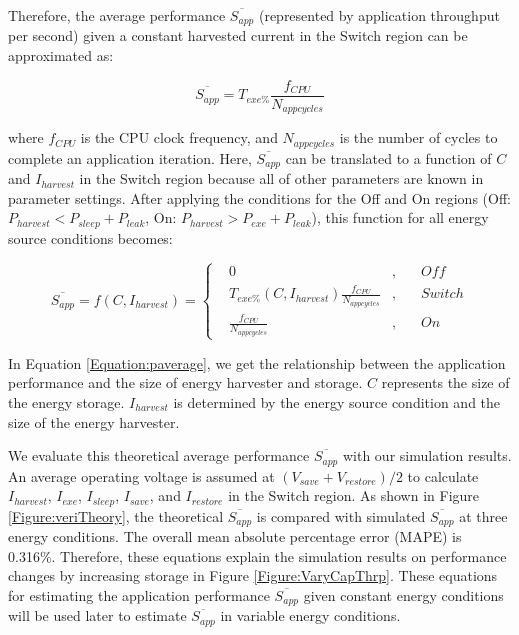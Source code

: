 Therefore, the average performance $\overline{S_{app}}$ (represented by application throughput per second) given a constant harvested current in the Switch region can be approximated as:

\begin{equation}
    \overline{S_{app}} = T_{exe\%}\frac{f_{CPU}}{N_{appcycles}}
\end{equation}

where $f_{CPU}$ is the CPU clock frequency, and $N_{appcycles}$ is the number of cycles to complete an application iteration. Here, $\overline{S_{app}}$ can be translated to a function of $C$ and $I_{harvest}$ in the Switch region because all of other parameters are known in parameter settings. After applying the conditions for the Off and On regions (Off: $P_{harvest} < P_{sleep} + P_{leak}$, On: $P_{harvest} > P_{exe} + P_{leak}$), this function for all energy source conditions becomes:

\begin{equation}
    \overline{S_{app}} = f(C, I_{harvest}) = \left\{\begin{aligned}
        & 0 & , & \quad Off \\
        & T_{exe\%} (C, I_{harvest}) \frac{f_{CPU}}{N_{appcycles}} & , & \quad Switch \\
        & \frac{f_{CPU}}{N_{appcycles}} & , & \quad On
    \end{aligned}
    \right.
    \label{Equation:paverage}
\end{equation}

In Equation \ref{Equation:paverage}, we get the relationship between the application performance and the size of energy harvester and storage. $C$ represents the size of the energy storage. $I_{harvest}$ is determined by the energy source condition and the size of the energy harvester. 

We evaluate this theoretical average performance $\overline{S_{app}}$ with our simulation results. An average operating voltage is assumed at $(V_{save} + V_{restore})/2$ to calculate $I_{harvest}$, $I_{exe}$, $I_{sleep}$, $I_{save}$, and $I_{restore}$ in the Switch region. As shown in Figure \ref{Figure:veriTheory}, the theoretical $\overline{S_{app}}$ is compared with simulated $\overline{S_{app}}$ at three energy conditions. The overall mean absolute percentage error (MAPE) is 0.316\%. Therefore, these equations explain the simulation results on performance changes by increasing storage in Figure \ref{Figure:VaryCapThrp}. These equations for estimating the application performance $\overline{S_{app}}$ given constant energy conditions will be used later to estimate $\overline{S_{app}}$ in variable energy conditions. 

